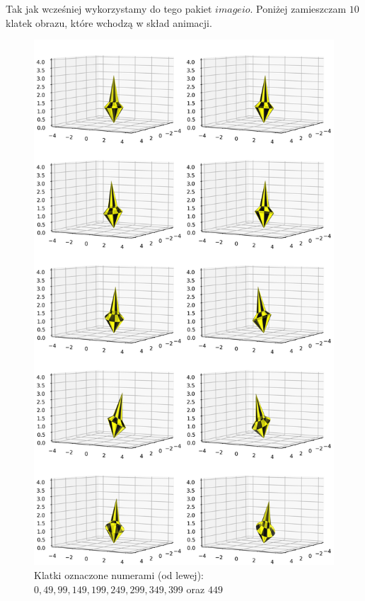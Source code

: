 \documentclass[a4paper,twoside,11pt,reqno]{mwrep}
\theoremstyle{plain} \newtheorem{twr}{Twierdzenie}
\theoremstyle{plain} \newtheorem{lem}{Lemat}
\theoremstyle{definition} \newtheorem{defi}{Definicja}
\theoremstyle{remark} \newtheorem*{wni}{Wniosek}
\theoremstyle{definition} \newtheorem{uwaga}{Uwaga}
\theoremstyle{definition}\newtheorem{prz}{Przykład}
\begin{document}
Tak jak wcześniej wykorzystamy do tego pakiet $imageio$.
Poniżej zamieszczam $10$ klatek obrazu, które wchodzą w skład animacji.
\newpage
$\left. \right. $
\begin{figure}

\begin{center}
\includegraphics[width=13 cm]{MergedMatrix.png}
\caption{Klatki oznaczone numerami (od lewej): $0,49,99,149,199,249,299,349,399$ oraz $449$}
\end{center}

\end{figure}
$\left. \right. $
\newpage
\end{document}

